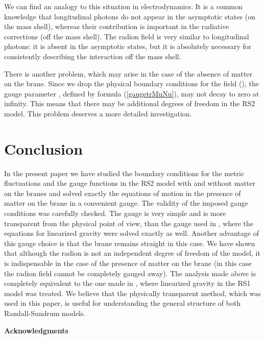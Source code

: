 \documentclass[a4paper,12pt]{article}
\begin{document}
We can find an analogy to this situation in  electrodynamics. It is a
common knowledge that  longitudinal photons do not appear in  the
asymptotic states (on the mass shell), whereas their contribution is
important in the radiative corrections (off the mass shell). The radion
field is very similar to longitudinal photons: it is absent in the
asymptotic states, but it is absolutely necessary for consistently
describing the interaction off the mass shell.

There is another problem, which  may arise in the case of the absence of
matter on the brane. Since we drop the physical boundary conditions for the
field \coordHE{} (\coordHE{}), the gauge parameter
\myHighlight{$\xi_{\mu}$}\coordHE{}, defined by formula (\ref{gaugetrMuNu}), may not decay to zero
\coordHE{} at infinity. This means that there may be additional
degrees of freedom in the RS2 model. This problem deserves  a more detailed
investigation.




\section{Conclusion}
In the present paper we have studied the boundary conditions for
the metric fluctuations and the gauge functions  in the RS2 model
with and without matter on the branes and  solved  exactly the
equations of motion in the presence of matter on the brane  in a
convenient gauge. The validity of the imposed gauge conditions
was carefully checked. The gauge is very simple and is more
transparent from the physical point of view,  than the gauge used
in \cite{AIMVV}, where the equations for linearized gravity were
solved exactly as well. Another advantage of this gauge choice is
that the  brane remains straight in this case. We have shown
that although the radion is not an independent degree of freedom
of the model, it is indispensable in the case of the presence of
matter on the brane (in this case the radion field cannot be
completely gauged away). The analysis made above is completely
equivalent to the one made in \cite{BKSV,SV}, where linearized
gravity in the RS1 model was treated. We believe that the physically
transparent method, which was used in this paper, is useful for
understanding the general structure of both  Randall-Sundrum models.


\bigskip
{ \large \bf Acknowledgments}
\medskip
\end{document}

